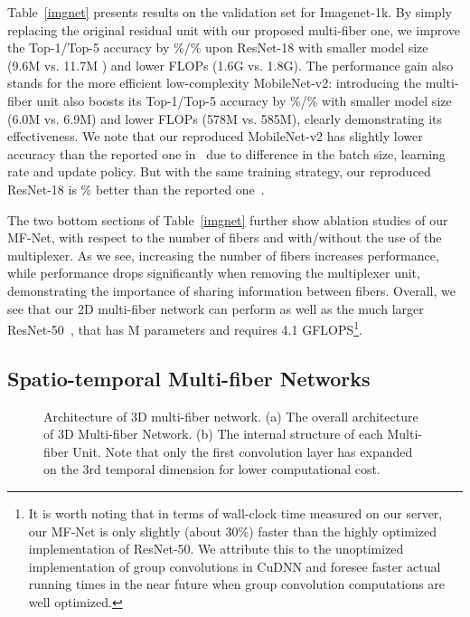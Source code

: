 \documentclass[runningheads]{llncs}
\newcommand{\ours}[0]{MF-Net\xspace}
\newcommand{\ourslong}[0]{multi-fiber\xspace}
\newcommand{\ourslongcap}[0]{Multi-fiber\xspace}
\newcommand{\switch}[0]{multiplexer\xspace}
\begin{document}
Table~\ref{imgnet} presents results on the validation set for Imagenet-1k. By simply replacing the original residual unit with our proposed \ourslong one, we improve the Top-1/Top-5 accuracy by \%/\% upon ResNet-18 with smaller model size (9.6M vs. 11.7M ) and lower FLOPs (1.6G vs. 1.8G). The performance gain also stands for the more efficient low-complexity MobileNet-v2: introducing the \ourslong unit also boosts its Top-1/Top-5 accuracy by \%/\% with smaller model size (6.0M vs. 6.9M) and lower FLOPs (578M vs. 585M), clearly demonstrating its effectiveness. 
We note that our reproduced MobileNet-v2 has slightly lower accuracy than the reported one in~\cite{sandler2018inverted} due to difference in the batch size, learning rate and update policy. But with the same training strategy, our reproduced ResNet-18 is \% better than the reported one~\cite{he2016deep}.

The two bottom sections of Table~\ref{imgnet} further show ablation studies of our \ours, with respect to the number of fibers  and with/without the use of the \switch. As we see, increasing the number of fibers increases performance, while performance drops significantly when removing the \switch unit, demonstrating the importance of sharing information between fibers. Overall, we see that our 2D \ourslong network can perform as well as the much larger ResNet-50~\cite{he2016deep}, that has M parameters and requires 4.1 GFLOPS\footnote{It is worth noting that in terms of wall-clock time measured on our server, our \ours is only slightly (about 30\%) faster than the highly optimized implementation of ResNet-50. We attribute this to the unoptimized implementation of group convolutions in CuDNN and foresee faster actual running times in the near future when group convolution computations are well optimized.}.



\subsection{Spatio-temporal \ourslongcap Networks}
\label{Network_Architecture}


\begin{figure}[t]	
	\center
	\caption{Architecture of 3D \ourslong network. (a) The overall architecture of 3D \ourslongcap Network. (b) The internal structure of each \ourslongcap Unit. Note that only the first  convolution layer has expanded on the 3rd temporal dimension for lower computational cost.}
	\label{fig_network_3d}
\end{figure}
\end{document}
